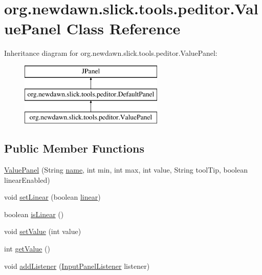 \hypertarget{classorg_1_1newdawn_1_1slick_1_1tools_1_1peditor_1_1_value_panel}{}\section{org.\+newdawn.\+slick.\+tools.\+peditor.\+Value\+Panel Class Reference}
\label{classorg_1_1newdawn_1_1slick_1_1tools_1_1peditor_1_1_value_panel}
Inheritance diagram for org.\+newdawn.\+slick.\+tools.\+peditor.\+Value\+Panel\+:\begin{figure}[H]
\begin{center}
\leavevmode
\includegraphics[height=3.000000cm]{classorg_1_1newdawn_1_1slick_1_1tools_1_1peditor_1_1_value_panel}
\end{center}
\end{figure}
\subsection*{Public Member Functions}
\begin{DoxyCompactItemize}
\item 
\mbox{\hyperlink{classorg_1_1newdawn_1_1slick_1_1tools_1_1peditor_1_1_value_panel_ab24f7bd43b07cf5ee555dc768b340974}{Value\+Panel}} (String \mbox{\hyperlink{classorg_1_1newdawn_1_1slick_1_1tools_1_1peditor_1_1_value_panel_ac3f651b9e3f21c979dc9f3c7df17da3a}{name}}, int min, int max, int value, String tool\+Tip, boolean linear\+Enabled)
\item 
void \mbox{\hyperlink{classorg_1_1newdawn_1_1slick_1_1tools_1_1peditor_1_1_value_panel_a3bed734dc87c5562ffc73169bfdfa35e}{set\+Linear}} (boolean \mbox{\hyperlink{classorg_1_1newdawn_1_1slick_1_1tools_1_1peditor_1_1_value_panel_accd8a5d5872a9fe38b1e546944982dfd}{linear}})
\item 
boolean \mbox{\hyperlink{classorg_1_1newdawn_1_1slick_1_1tools_1_1peditor_1_1_value_panel_a25dc49b1a78fa4c8e1556520343bf605}{is\+Linear}} ()
\item 
void \mbox{\hyperlink{classorg_1_1newdawn_1_1slick_1_1tools_1_1peditor_1_1_value_panel_a8cfa3d3ef8c70a27962db60cfaa1e7fc}{set\+Value}} (int value)
\item 
int \mbox{\hyperlink{classorg_1_1newdawn_1_1slick_1_1tools_1_1peditor_1_1_value_panel_a7305b51023972797f8079b7df81032f8}{get\+Value}} ()
\item 
void \mbox{\hyperlink{classorg_1_1newdawn_1_1slick_1_1tools_1_1peditor_1_1_value_panel_a59d66d887ca6a03762f54b8d0a9a75bd}{add\+Listener}} (\mbox{\hyperlink{interfaceorg_1_1newdawn_1_1slick_1_1tools_1_1peditor_1_1_input_panel_listener}{Input\+Panel\+Listener}} listener)
\end{DoxyCompactItemize}
